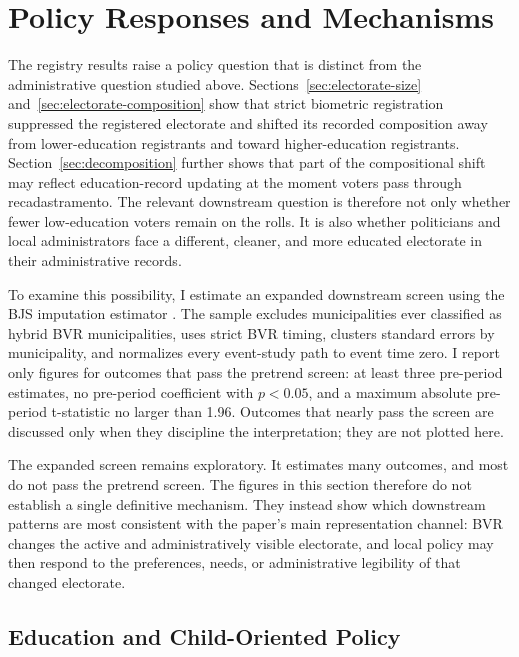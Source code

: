 \section{Policy Responses and Mechanisms}
\label{sec:policy-responses}

The registry results raise a policy question that is distinct from the administrative question studied above. Sections~\ref{sec:electorate-size} and~\ref{sec:electorate-composition} show that strict biometric registration suppressed the registered electorate and shifted its recorded composition away from lower-education registrants and toward higher-education registrants. Section~\ref{sec:decomposition} further shows that part of the compositional shift may reflect education-record updating at the moment voters pass through recadastramento. The relevant downstream question is therefore not only whether fewer low-education voters remain on the rolls. It is also whether politicians and local administrators face a different, cleaner, and more educated electorate in their administrative records.

To examine this possibility, I estimate an expanded downstream screen using the BJS imputation estimator \citep{Borusyak2024RevisitiEventStudy}. The sample excludes municipalities ever classified as hybrid BVR municipalities, uses strict BVR timing, clusters standard errors by municipality, and normalizes every event-study path to event time zero. I report only figures for outcomes that pass the pretrend screen: at least three pre-period estimates, no pre-period coefficient with $p<0.05$, and a maximum absolute pre-period t-statistic no larger than 1.96. Outcomes that nearly pass the screen are discussed only when they discipline the interpretation; they are not plotted here.

The expanded screen remains exploratory. It estimates many outcomes, and most do not pass the pretrend screen. The figures in this section therefore do not establish a single definitive mechanism. They instead show which downstream patterns are most consistent with the paper's main representation channel: BVR changes the active and administratively visible electorate, and local policy may then respond to the preferences, needs, or administrative legibility of that changed electorate.

\newcommand{\BJSFigRoot}{../resources/figures/downstream_bjs_ref0_nonhybrid}

\subsection{Education and Child-Oriented Policy}
\label{ssec:policy-education}


